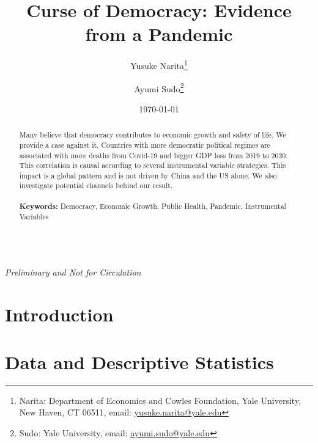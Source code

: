 \documentclass[8pt]{article}
\begin{document}
\begin{titlepage}
\title{Curse of Democracy: Evidence from a Pandemic}
\author{Yusuke Narita\thanks{Narita: Department of Economics and Cowles Foundation, Yale University, New Haven, CT 06511, email: \url{yusuke.narita@yale.edu}} \and Ayumi Sudo\thanks{Sudo: Yale University, email: \url{ayumi.sudo@yale.edu}}}
\date{\today}
\maketitle

\begin{abstract}
\noindent Many believe that democracy contributes to economic growth and safety of life. We provide a case against it. Countries with more democratic political regimes are associated with more deaths from Covid-19 and bigger GDP loss from 2019 to 2020. This correlation is causal according to several instrumental variable strategies. This impact is a global pattern and is not driven by China and the US alone. We also investigate potential channels behind our result.\\
\vspace{0in}\\
\noindent\textbf{Keywords:} Democracy, Economic Growth, Public Health, Pandemic, Instrumental Variables\\
\vspace{0in}\\

\bigskip
\end{abstract}
\begin{center}
\LARGE{\textit{Preliminary and Not for Circulation}}
\end{center}

\setcounter{page}{0}
\thispagestyle{empty}
\end{titlepage}
\pagebreak \newpage



\section{Introduction} \label{sec:intro}



\section{Data and Descriptive Statistics} \label{sec:data}

\end{document}
